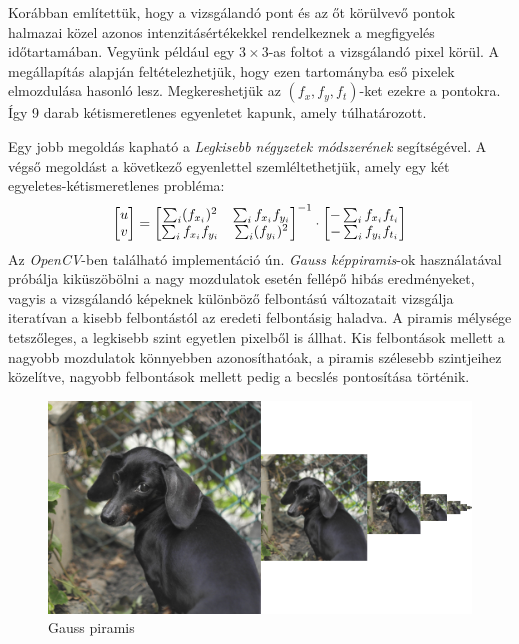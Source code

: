 Korábban említettük, hogy a vizsgálandó pont és az őt körülvevő pontok halmazai közel azonos intenzitásértékekkel rendelkeznek a megfigyelés időtartamában. Vegyünk például egy $3 \times 3$-as foltot a vizsgálandó pixel körül. A megállapítás alapján feltételezhetjük, hogy ezen tartományba eső pixelek elmozdulása hasonló lesz. Megkereshetjük az $(f_x,f_y,f_t)$-ket ezekre a pontokra. Így 9 darab kétismeretlenes egyenletet kapunk, amely túlhatározott.

Egy jobb megoldás kapható a \textit{Legkisebb négyzetek módszerének} segítségével. A végső megoldást a következő egyenlettel szemléltethetjük, amely egy két egyeletes-kétismeretlenes probléma:
\begin{align*}
\bmatrix u \\ v \endbmatrix = {\bmatrix \sum_{i}(f_{x_i})^2 & \sum_{i}f_{x_i}f_{y_i}\\ \sum_{i}f_{x_i}f_{y_i} & \sum_{i}(f_{y_i})^2 \endbmatrix}^{-1} \cdot \bmatrix -\sum_{i}f_{x_i}f_{t_i} \\ -\sum_{i}f_{y_i}f_{t_i} \endbmatrix
\end{align*}
Az \textit{OpenCV}-ben található implementáció ún. \textit{Gauss képpiramis}-ok használatával próbálja kiküszöbölni a nagy mozdulatok esetén fellépő hibás eredményeket, vagyis a vizsgálandó képeknek különböző felbontású változatait vizsgálja iteratívan a kisebb felbontástól az eredeti felbontásig haladva. A piramis mélysége tetszőleges, a legkisebb szint egyetlen pixelből is állhat. Kis felbontások mellett a nagyobb mozdulatok könnyebben azonosíthatóak, a piramis szélesebb szintjeihez közelítve, nagyobb felbontások mellett pedig a becslés pontosítása történik. \cite{lucas1981iterative} \cite{bradski2008learning}

\begin{figure}[h]
\centering
\includegraphics[width=7.65truecm, height=3.84truecm]{images/gauss_pyramid.png}
\caption{Gauss piramis}
\label{fig:gausspyramid}
\end{figure}

